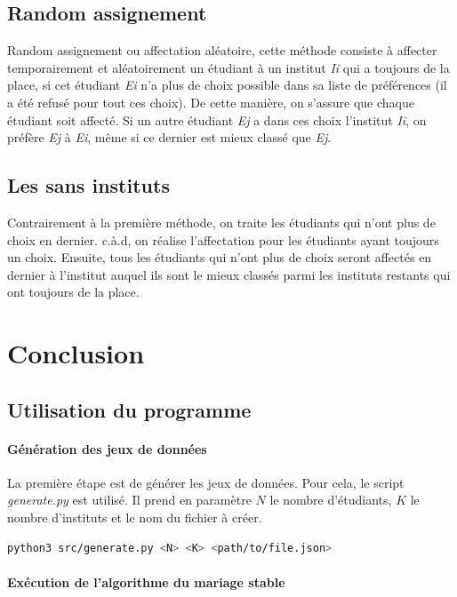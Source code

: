 \documentclass[12pt,titlepage]{article}
\begin{document}
\subsection{Random assignement}
Random assignement ou affectation aléatoire, cette méthode consiste à affecter temporairement et aléatoirement un étudiant à un institut \textit{Ii} qui a toujours de la place, si cet étudiant \textit{Ei} n'a plus de choix possible dans sa liste de préférences (il a été refusé pour tout ces choix). De cette manière, on s'assure que chaque étudiant soit affecté. Si un autre étudiant \textit{Ej} a dans ces choix l'institut \textit{Ii}, on préfère \textit{Ej} à \textit{Ei}, même si ce dernier est mieux classé que \textit{Ej}.
\subsection{Les sans instituts}
Contrairement à la première méthode, on traite les étudiants qui n'ont plus de choix en dernier. c.à.d, on réalise l'affectation pour les étudiants ayant toujours un choix. Ensuite, tous les étudiants qui n'ont plus de choix seront affectés en dernier à l'institut auquel ils sont le mieux classés parmi les instituts restants qui ont toujours de la place.
\section{Conclusion}

\subsection{Utilisation du programme}

\paragraph{Génération des jeux de données}

La première étape est de générer les jeux de données. Pour cela, le script \textit{generate.py} est utilisé. Il prend en paramètre $N$ le nombre d'étudiants, $K$ le nombre d'instituts et le nom du fichier à créer.

\begin{lstlisting}[language=bash,caption="Commande qui génére un jeu de données"]
  python3 src/generate.py <N> <K> <path/to/file.json>
\end{lstlisting}

\paragraph{Exécution de l'algorithme du mariage stable}
\end{document}

